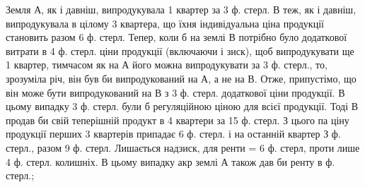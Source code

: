 Земля А, як і давніш, випродукувала 1 квартер за 3 ф. стерл. В теж,
як і давніш, випродукувала в цілому 3 квартера, що їхня індивідуальна ціна
продукції становить разом 6 ф. стерл. Тепер, коли б на землі В потрібно було
додаткової витрати в 4 ф. стерл. ціни продукції (включаючи і зиск), щоб випродукувати ще 1 квартер,
тимчасом як на А його можна випродукувати за
3 ф. стерл., то, зрозуміла річ, він був би випродукований на А, а не на В.
Отже, припустімо, що він може бути випродукований на В з 3 ф. стерл.
додаткової ціни продукції. В цьому випадку 3  ф. стерл. були б регуляційною ціною
для всієї продукції. Тоді В продав би свій теперішній продукт в 4  квартери за
15  ф. стерл. З цього па ціну продукції перших 3  квартерів припадає
6 ф. стерл. і на останній квартер З  ф. стерл., разом 9  ф. стерл. Лишається
надзиск, для ренти = 6  ф. стерл, проти лише 4  ф. стерл. колишніх.
В цьому випадку акр землі А також дав би ренту в    ф. стерл.;
\parbreak{}  %
